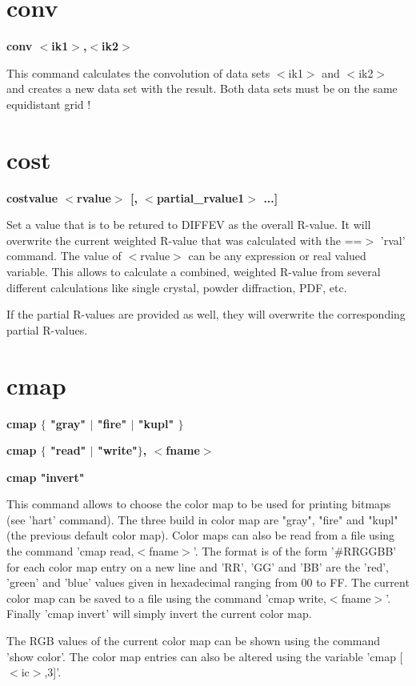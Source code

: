 \section{conv}
{\bf conv $ <$ik1$> $,$ <$ik2$> $ \par }
\par
\vspace{3pt}
This command calculates the convolution of data sets $ <$ik1$> $ and 
$ <$ik2$> $ and creates a new data set with the result. Both data sets 
must be on the same equidistant grid ! 
\section{cost}
{\bf costvalue  $ <$rvalue$> $ [, $ <$partial\_rvalue1$> $ ...] \par }
\par
\vspace{3pt}
Set a value that is to be retured to DIFFEV as the overall 
R-value. It will overwrite the current weighted R-value 
that was calculated with the ==$> $ 'rval' command. 
The value of $ <$rvalue$> $ can be any expression or real valued 
variable. This allows to calculate a combined, weighted 
R-value from several different calculations like single 
crystal, powder diffraction, PDF, etc. 
\par
If the partial R-values are provided as well, they will 
overwrite the corresponding partial R-values. 
\section{cmap}
{\bf cmap $ \{$ "gray" $| $ "fire" $| $ "kupl"  $\} $ \par }
{\bf cmap $ \{$ "read" $| $ "write"$\} $, $ <$fname$> $ \par }
{\bf cmap "invert" \par }
\par
\vspace{3pt}
This command allows to choose the color map to be used for printing 
bitmaps (see 'hart' command). The three build in color map are 
"gray", "fire" and "kupl" (the previous default color map). Color maps 
can also be read from a file using the command 'cmap read,$ <$fname$> $'. 
The format is of the form '\#RRGGBB' for each color map entry on a 
new line and 'RR', 'GG' and 'BB' are the 'red', 'green' and 'blue' 
values given in hexadecimal ranging from 00 to FF. The current 
color map can be saved to a file using the command 'cmap write,$ <$fname$> $'. 
Finally 'cmap invert' will simply invert the current color map. 
\par
The RGB values of the current color map can be shown using the 
command 'show color'. The color map entries can also be altered 
using the variable 'cmap [$ <$ic$> $,3]'. 
